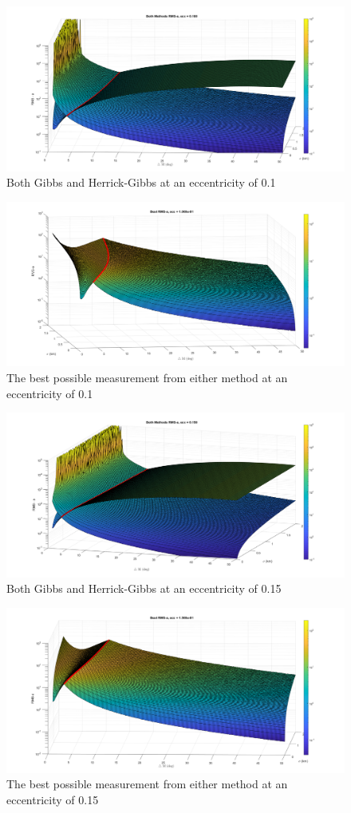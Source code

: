 \documentclass[12pt]{article}
\begin{document}
	\begin{figure}[H]
	\centering
	\includegraphics[width=0.7\linewidth]{bothMethods_e_1}
	\caption{Both Gibbs and Herrick-Gibbs at an eccentricity of 0.1}
	\label{fig:bothmethodse1}
\end{figure}
\begin{figure}
	\centering
	\includegraphics[width=0.7\linewidth]{bestMethods_e_1}
	\caption{The best possible measurement from either method at an eccentricity of 0.1}
	\label{fig:bestmethodse1}
\end{figure}
	\begin{figure}
	\centering
	\includegraphics[width=0.7\linewidth]{bothMethods_e_15}
	\caption{Both Gibbs and Herrick-Gibbs at an eccentricity of 0.15}
	\label{fig:bothmethodse15}
\end{figure}
\begin{figure}
	\centering
	\includegraphics[width=0.7\linewidth]{bestMethods_e_15}
	\caption{The best possible measurement from either method at an eccentricity of 0.15}
	\label{fig:bestmethodse15}
\end{figure}
\end{document}
